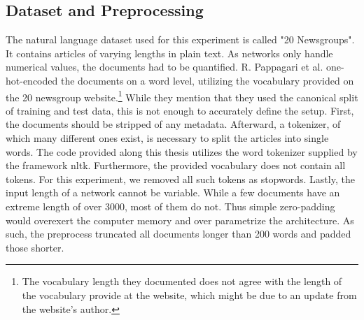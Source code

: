 \subsection*{Dataset and Preprocessing}
The natural language dataset used for this experiment is called "20 Newsgroups". It contains articles of varying lengths in plain text. As networks only handle numerical values, the documents had to be quantified. R. Pappagari et al. one-hot-encoded the documents on a word level, utilizing the vocabulary provided on the 20 newsgroup website.\footnote{
	The vocabulary length they documented does not agree with the length of the vocabulary provide at the website, which might be due to an update from the website's author. 
	}
While they mention that they used the canonical split of training and test data, this is not enough to accurately define the setup. First, the documents should be stripped of any metadata. Afterward, a tokenizer, of which many different ones exist, is necessary to split the articles into single words. The code provided along this thesis utilizes the word tokenizer supplied by the framework nltk. Furthermore, the provided vocabulary does not contain all tokens. For this experiment, we removed all such tokens as stopwords. 
Lastly, the input length of a network cannot be variable. While a few documents have an extreme length of over 3000, most of them do not. Thus simple zero-padding would overexert the computer memory and over parametrize the architecture. As such, the preprocess truncated all documents longer than 200 words and padded those shorter.


